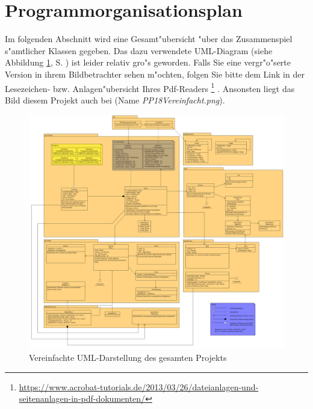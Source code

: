 \section{Programmorganisationsplan}
\label{sec:programmorganisationsplan}
Im folgenden Abschnitt wird eine Gesamt"ubersicht "uber das Zusammenspiel s"amtlicher Klassen gegeben. Das dazu verwendete UML-Diagram (siehe Abbildung \ref{fig:umlGesamtVereinfacht}, S.  \pageref{fig:umlGesamtVereinfacht}) ist leider relativ gro"s geworden. Falls Sie eine vergr"o"serte Version in ihrem Bildbetrachter sehen m"ochten, folgen Sie bitte dem Link in der Lesezeichen- bzw. Anlagen"ubersicht Ihres Pdf-Readers
\footnote{\url{https://www.acrobat-tutorials.de/2013/03/26/dateianlagen-und-seitenanlagen-in-pdf-dokumenten/}}
. Ansonsten liegt das Bild diesem Projekt auch bei (Name \emph{PP18Vereinfacht.png}). 


\begin{figure}
	\centering
	\includegraphics[width=\linewidth]{pics/PP18Vereinfacht}
	\caption{Vereinfachte UML-Darstellung des gesamten Projekts}
	\label{fig:umlGesamtVereinfacht}
\end{figure}


